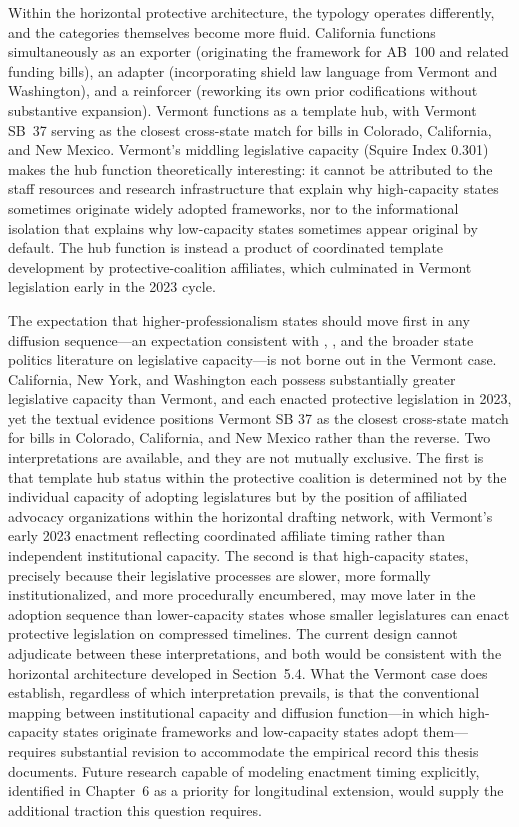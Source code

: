 Within the horizontal protective architecture, the typology operates differently, and the categories themselves become more fluid. California functions simultaneously as an exporter (originating the framework for AB~100 and related funding bills), an adapter (incorporating shield law language from Vermont and Washington), and a reinforcer (reworking its own prior codifications without substantive expansion). Vermont functions as a template hub, with Vermont SB~37 serving as the closest cross-state match for bills in Colorado, California, and New Mexico. Vermont's middling legislative capacity (Squire Index 0.301) makes the hub function theoretically interesting: it cannot be attributed to the staff resources and research infrastructure that explain why high-capacity states sometimes originate widely adopted frameworks, nor to the informational isolation that explains why low-capacity states sometimes appear original by default. The hub function is instead a product of coordinated template development by protective-coalition affiliates, which culminated in Vermont legislation early in the 2023 cycle.

The expectation that higher-professionalism states should move first in any diffusion sequence---an expectation consistent with \textcite{squireMeasuringStateLegislative2007}, \textcite{shipanMechanismsPolicyDiffusion2008a}, and the broader state politics literature on legislative capacity---is not borne out in the Vermont case. California, New York, and Washington each possess substantially greater legislative capacity than Vermont, and each enacted protective legislation in 2023, yet the textual evidence positions Vermont SB 37 as the closest cross-state match for bills in Colorado, California, and New Mexico rather than the reverse. Two interpretations are available, and they are not mutually exclusive. The first is that template hub status within the protective coalition is determined not by the individual capacity of adopting legislatures but by the position of affiliated advocacy organizations within the horizontal drafting network, with Vermont's early 2023 enactment reflecting coordinated affiliate timing rather than independent institutional capacity. The second is that high-capacity states, precisely because their legislative processes are slower, more formally institutionalized, and more procedurally encumbered, may move later in the adoption sequence than lower-capacity states whose smaller legislatures can enact protective legislation on compressed timelines. The current design cannot adjudicate between these interpretations, and both would be consistent with the horizontal architecture developed in Section~5.4. What the Vermont case does establish, regardless of which interpretation prevails, is that the conventional mapping between institutional capacity and diffusion function---in which high-capacity states originate frameworks and low-capacity states adopt them---requires substantial revision to accommodate the empirical record this thesis documents. Future research capable of modeling enactment timing explicitly, identified in Chapter~6 as a priority for longitudinal extension, would supply the additional traction this question requires.
 
